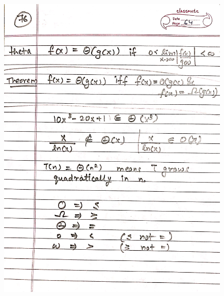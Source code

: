 \begin{figure}[H]
    \centering
    \includegraphics[width=16cm, height=21cm]{"./MIT-6.042J/MIT-6042J-076"}
\end{figure}
\newpage
